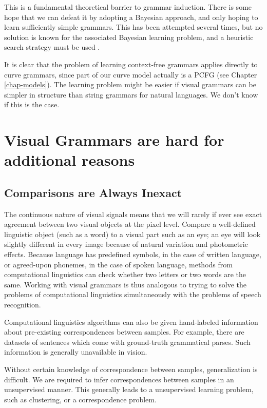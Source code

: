 This is a fundamental theoretical barrier to grammar induction. There
is some hope that we can defeat it by adopting a Bayesian approach,
and only hoping to learn sufficiently simple grammars. This has been
attempted several times, but no solution is known for the associated
Bayesian learning problem, and a heuristic search strategy must be
used \cite{cook, stolcke, nevill-manning}.

It is clear that the problem of learning context-free grammars applies
directly to curve grammars, since part of our curve model actually is
a PCFG (see Chapter \ref{chap-models}). The learning problem might be
easier if visual grammars can be simpler in structure than string
grammars for natural languages. We don't know if this is the case.

\section{Visual Grammars are hard for additional reasons}

\subsection{Comparisons are Always Inexact}

The continuous nature of visual signals means that we will rarely if
ever see exact agreement between two visual objects at the pixel
level. Compare a well-defined linguistic object (such as a word) to a
visual part such as an eye; an eye will look slightly different in
every image because of natural variation and photometric
effects. Because language has predefined symbols, in the case of
written language, or agreed-upon phonemes, in the case of spoken
language, methods from computational linguistics can check whether two
letters or two words are the same. Working with visual grammars is
thus analogous to trying to solve the problems of computational
linguistics simultaneously with the problems of speech recognition.

Computational linguistics algorithms can also be given hand-labeled
information about pre-existing correspondences between samples. For
example, there are datasets of sentences which come with ground-truth
grammatical parses. Such information is generally unavailable in
vision. 

Without certain knowledge of correspondence between samples,
generalization is difficult. We are required to infer correspondences
between samples in an unsupervised manner. This generally leads to a
unsupervised learning problem, such as clustering, or a correspondence
problem.

